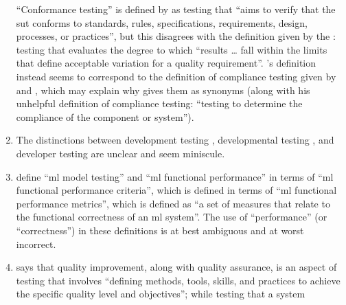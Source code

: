 \begin{enumerate}
          ``Conformance testing'' is defined by \citet[p.~5\=/7]{SWEBOK2025} as
          testing that ``aims to verify that the \acs{sut} conforms to
          standards, rules, specifications, requirements, design, processes, or
          practices'', but this disagrees with the definition given by the
          \citet[p.~523]{PMBOK2013}: testing that evaluates the degree to which
          ``results \dots{} fall within the limits that define acceptable
          variation for a quality requirement''. \citeauthor{SWEBOK2025}'s
          definition instead seems to correspond to the definition of
          compliance testing given by \citetISTQB{} and
          \citet[p.~33]{Firesmith2015}, which may explain why
          \citet[p.~43]{Kam2008} gives them as synonyms (along with his
          unhelpful definition of compliance testing: ``testing to determine
          the compliance of the component or system'').
    \item %
          The distinctions between development testing \citep[p.~136]{IEEE2017},
          developmental testing \citep[p.~30]{Firesmith2015}, and developer
          testing \citep[p.~39;][p.~11]{Gerrard2000a} are unclear and seem
          miniscule.
    \item %
          \citetISTQB{} define
          ``\acf{ml} model testing'' and ``\acs{ml} functional performance''
          in terms of ``\acs{ml} functional performance criteria'',
          which is defined in terms of ``\acs{ml} functional performance
          metrics'', which is defined as ``a set of measures that relate to the
          functional correctness of an \acs{ml} system''. The use
          of ``performance'' (or ``correctness'') in these definitions is at
          best ambiguous and at worst incorrect.
    \item %
          \citet[p.~5\=/4]{SWEBOK2025} says that quality improvement,
          along with quality assurance, is an aspect of testing that involves
          ``defining methods, tools, skills, and practices to achieve the
          specific quality level and objectives''; while testing that a system

\end{enumerate}
